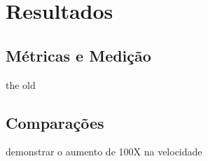 \chapter{Resultados}
\label{cap:resultados}

\section{Métricas e Medição}
  the old

\section{Comparações}
  demonstrar o aumento de 100X na velocidade
